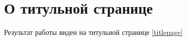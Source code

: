 \section{О титульной странице}



Результат работы виден на титульной странице \pageref{titlepage} \ref{titlepage}

\clearpage